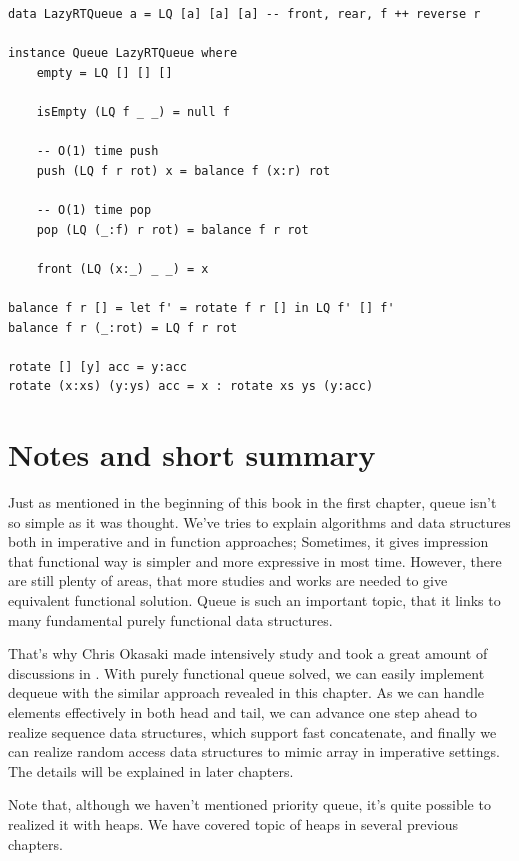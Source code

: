 \documentclass{article}
\begin{document}
\lstset{language=Haskell}
\begin{lstlisting}
data LazyRTQueue a = LQ [a] [a] [a] -- front, rear, f ++ reverse r

instance Queue LazyRTQueue where
    empty = LQ [] [] []

    isEmpty (LQ f _ _) = null f

    -- O(1) time push
    push (LQ f r rot) x = balance f (x:r) rot

    -- O(1) time pop
    pop (LQ (_:f) r rot) = balance f r rot

    front (LQ (x:_) _ _) = x

balance f r [] = let f' = rotate f r [] in LQ f' [] f'
balance f r (_:rot) = LQ f r rot

rotate [] [y] acc = y:acc
rotate (x:xs) (y:ys) acc = x : rotate xs ys (y:acc)
\end{lstlisting}

\section{Notes and short summary}
Just as mentioned in the beginning of this book in the first chapter,
queue isn't so simple as it was thought. We've tries to explain
algorithms and data structures both in imperative and in function
approaches; Sometimes, it gives impression that functional way is
simpler and more expressive in most time. However, there are still
plenty of areas, that more studies and works are needed to give equivalent
functional solution. Queue is such an important topic, that it
links to many fundamental purely functional data structures.

That's why Chris Okasaki made intensively study and took a great
amount of discussions in \cite{okasaki-book}. With purely functional
queue solved, we can easily implement dequeue with the similar
approach revealed in this chapter. As we can handle elements effectively
in both head and tail, we can advance one step ahead to realize
sequence data structures, which support fast concatenate, and
finally we can realize random access data structures to mimic
array in imperative settings. The details will be explained
in later chapters.

Note that, although we haven't mentioned priority queue, it's quite
possible to realized it with heaps. We have covered topic of heaps
in several previous chapters.
\end{document}

